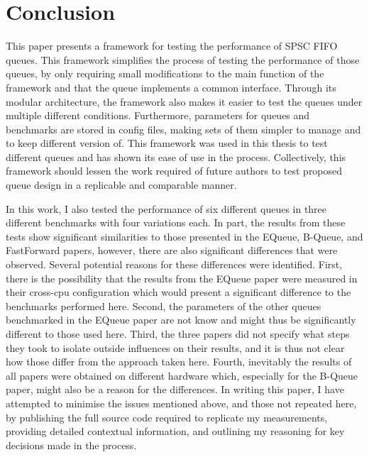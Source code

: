 \chapter{Conclusion}
This paper presents a framework for testing the performance of SPSC FIFO queues.
This framework simplifies the process of testing the performance of those queues, by only requiring small
modifications to the main function of the framework and that the queue implements a common interface.
Through its modular architecture, the framework also makes it easier to test the queues under multiple
different conditions.
Furthermore, parameters for queues and benchmarks are stored in config files, making sets of them simpler to
manage and to keep different version of.
This framework was used in this thesis to test different queues and has shown its ease of use in the process.
Collectively, this framework should lessen the work required of future authors to test proposed queue design
in a replicable and comparable manner.

In this work, I also tested the performance of six different queues in three different benchmarks with four
variations each.
In part, the results from these tests show significant similarities to those presented in the EQueue,
B-Queue, and FastForward papers, however, there are also significant differences that were
observed\cite{EQueue,B-Queue,FastForward}.
Several potential reasons for these differences were identified.
First, there is the possibility that the results from the EQueue paper were measured in their cross-cpu
configuration which would present a significant difference to the benchmarks performed here.
Second, the parameters of the other queues benchmarked in the EQueue paper are not know and might thus be
significantly different to those used here.
Third, the three papers did not specify what steps they took to isolate outside influences on their results,
and it is thus not clear how those differ from the approach taken here.
Fourth, inevitably the results of all papers were obtained on different hardware which, especially for the
B-Queue paper, might also be a reason for the differences.
In writing this paper, I have attempted to minimise the issues mentioned above, and those not repeated here,
by publishing the full source code required to replicate my measurements, providing detailed contextual
information, and outlining my reasoning for key decisions made in the process.


